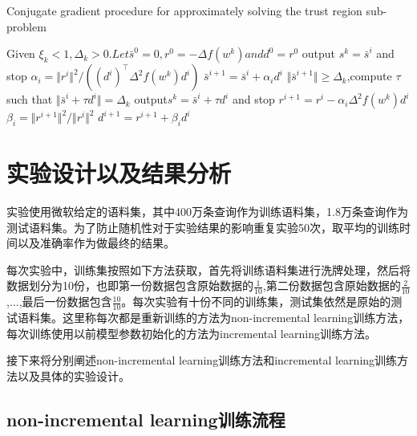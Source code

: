 \documentclass[master]{njuthesis}
\begin{document}
    \begin{algorithm}
    \caption{Conjugate gradient procedure for approximately solving the trust region sub-problem}\label{CG}
    \begin{algorithmic}[1]
      \State Given $\xi_k < 1,\Delta_k > 0. Let \bar{s}^0 = 0,r^0 = -\Delta f\left(w^k\right) and d^0 = r^0$
           \State output $s^k = \bar{s}^i $ and stop
         \EndIf
         \State $\alpha_i = \Vert r^i \Vert^2/\left(\left(d^i\right)^\intercal \Delta^2 f\left(w^k\right) d^i\right)$
         \State $\bar{s}^{i+1} = \bar{s}^{i} + \alpha_i d^i$
         \If $\Vert \bar{s}^{i+1} \Vert \ge \Delta_k$,compute $\tau$ such that
           \State $\Vert \bar{s}^i + \tau d^i \Vert = \Delta_k$
           \State output$s^k = \bar{s}^i + \tau d^i$ and stop
         \EndIf
         \State $r^{i+1} = r^{i} - \alpha_i \Delta^2 f\left(w^k\right) d^i$
         \State $\beta_i = \Vert r^{i+1} \Vert^2 / \Vert r^i \Vert^2$
         \State $d^{i+1} = r^{i+1} + \beta_i d^i$
       \EndFor
    \EndProcedure
    \end{algorithmic}
    \end{algorithm}

\section{实验设计以及结果分析}


    实验使用微软给定的语料集，其中400万条查询作为训练语料集，1.8万条查询作为测试语料集。为了防止随机性对于实验结果的影响重复实验50次，取平均的训练时间以及准确率作为做最终的结果。

    每次实验中，训练集按照如下方法获取，首先将训练语料集进行洗牌处理，然后将数据划分为10份，也即第一份数据包含原始数据的$\frac{1}{10}$,第二份数据包含原始数据的$\frac{2}{10}$,$\dots$,最后一份数据包含$\frac{10}{10}$。每次实验有十份不同的训练集，测试集依然是原始的测试语料集。这里称每次都是重新训练的方法为non-incremental learning训练方法，每次训练使用以前模型参数初始化的方法为incremental learning训练方法。
    
    接下来将分别阐述non-incremental learning训练方法和incremental learning训练方法以及具体的实验设计。

\subsection{non-incremental learning训练流程}
\end{document}
